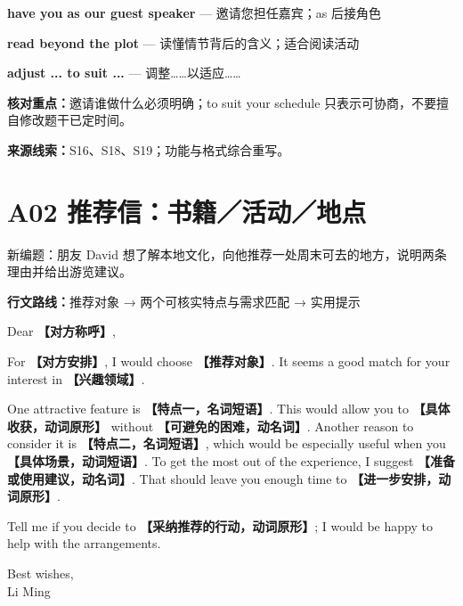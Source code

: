 \documentclass[11pt,a4paper,fontset=macnew]{ctexart}
\newenvironment{writing}{\begingroup\fontsize{10.5}{13.5}\selectfont\setlength{\parskip}{3pt}}{\par\endgroup}
\begin{document}
\par\vspace{4pt}{\bfseries 好词好句：优先记这三处}\par\nopagebreak
{\small\textbf{have you as our guest speaker} — 邀请您担任嘉宾；as 后接角色}\par
{\small\textbf{read beyond the plot} — 读懂情节背后的含义；适合阅读活动}\par
{\small\textbf{adjust ... to suit ...} — 调整……以适应……}\par
{\small\textbf{核对重点：}邀请谁做什么必须明确；to suit your schedule 只表示可协商，不要擅自修改题干已定时间。}\par
{\fontsize{8}{10}\selectfont\textbf{来源线索：}S16、S18、S19；功能与格式综合重写。}\par
\clearpage\section*{A02  推荐信：书籍／活动／地点}
{\small 新编题：朋友 David 想了解本地文化，向他推荐一处周末可去的地方，说明两条理由并给出游览建议。}\par
{\small\textbf{行文路线：}推荐对象 → 两个可核实特点与需求匹配 → 实用提示}\par
\par\vspace{4pt}{\bfseries 可替换模板}\par\nopagebreak
\begin{writing}
\noindent Dear {\bfseries 【对方称呼】},\par
For {\bfseries 【对方安排】}, I would choose {\bfseries 【推荐对象】}. It seems a good match for your interest in {\bfseries 【兴趣领域】}.

One attractive feature is {\bfseries 【特点一，名词短语】}. This would allow you to {\bfseries 【具体收获，动词原形】} without {\bfseries 【可避免的困难，动名词】}. Another reason to consider it is {\bfseries 【特点二，名词短语】}, which would be especially useful when you {\bfseries 【具体场景，动词短语】}. To get the most out of the experience, I suggest {\bfseries 【准备或使用建议，动名词】}. That should leave you enough time to {\bfseries 【进一步安排，动词原形】}.

Tell me if you decide to {\bfseries 【采纳推荐的行动，动词原形】}; I would be happy to help with the arrangements.

\noindent Best wishes,\\Li Ming\par
\end{writing}
\end{document}
